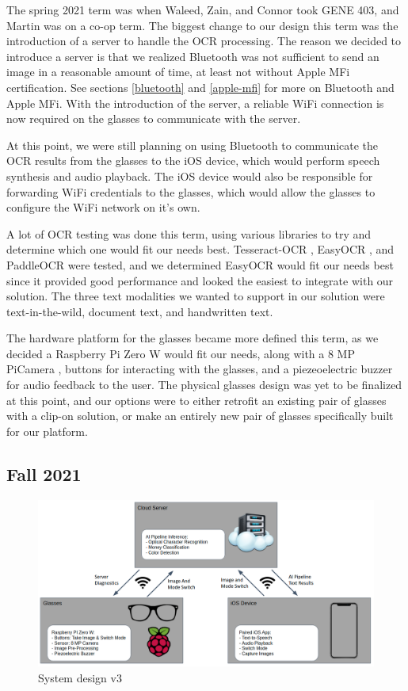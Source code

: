 \documentclass[a4paper,11pt]{article}
\begin{document}
The spring 2021 term was when Waleed, Zain, and Connor took GENE 403, and Martin was on a co-op term. The biggest change to our design this term was the introduction of a server to handle the OCR processing. The reason we decided to introduce a server is that we realized Bluetooth was not sufficient to send an image in a reasonable amount of time, at least not without Apple MFi certification. See sections \ref{bluetooth} and \ref{apple-mfi} for more on Bluetooth and Apple MFi. With the introduction of the server, a reliable WiFi connection is now required on the glasses to communicate with the server. 

At this point, we were still planning on using Bluetooth to communicate the OCR results from the glasses to the iOS device, which would perform speech synthesis and audio playback. The iOS device would also be responsible for forwarding WiFi credentials to the glasses, which would allow the glasses to configure the WiFi network on it's own.

A lot of OCR testing was done this term, using various libraries to try and determine which one would fit our needs best. Tesseract-OCR \cite{tesseract-github}, EasyOCR \cite{easy-ocr}, and PaddleOCR \cite{paddle-ocr} were tested, and we determined EasyOCR would fit our needs best since it provided good performance and looked the easiest to integrate with our solution. The three text modalities we wanted to support in our solution were text-in-the-wild, document text, and handwritten text.

The hardware platform for the glasses became more defined this term, as we decided a Raspberry Pi Zero W \cite{rpi-zero-w} would fit our needs, along with a 8 MP PiCamera \cite{rpi-camera}, buttons for interacting with the glasses, and a piezeoelectric buzzer for audio feedback to the user. The physical glasses design was yet to be finalized at this point, and our options were to either retrofit an existing pair of glasses with a clip-on solution, or make an entirely new pair of glasses specifically built for our platform.

\subsection{Fall 2021}
\label{fall-2021-design}
\begin{figure}[H]
\centering
\includegraphics[scale=0.4]{img/system_diagrams/system_diagram_v3.png}
\caption{System design v3}
\label{fig:system_diagram_v3}
\end{figure}
\end{document}
